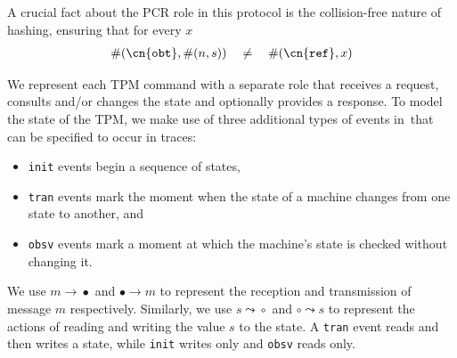 A crucial fact about the PCR role in this protocol is the
collision-free nature of hashing, ensuring that for every $x$
\begin{align} \label{eq:injective} \#(\mathtt{\cn{obt}},\#(n,s))
  \quad \neq \quad \#(\mathtt{\cn{ref}}, x )
\end{align}

We represent each TPM command with a separate role that receives a
request, consults and/or changes the state and optionally provides a
response. To model the state of the TPM, we make use of three additional
types of events in~\cpsa that can be specified to occur in traces:

\begin{itemize}

  
\item \texttt{init} events begin a sequence of states,
\item \texttt{tran} events mark the moment when the state of a machine changes from one state to another, and
\item \texttt{obsv} events mark a moment at which the machine's state is checked without changing it.
\end{itemize}

We use $m\!\!\to\!\!\bullet$ and $\bullet\!\!\to\!\!m$ to represent
the reception and transmission of message $m$ respectively. Similarly,
we use $s\!\leadsto\!\!\circ$ and $\circ\!\leadsto\!s$ to represent
the actions of reading and writing the value $s$ to the state.  A
\texttt{tran} event reads and then writes a state, while \texttt{init}
writes only and \texttt{obsv} reads only.

